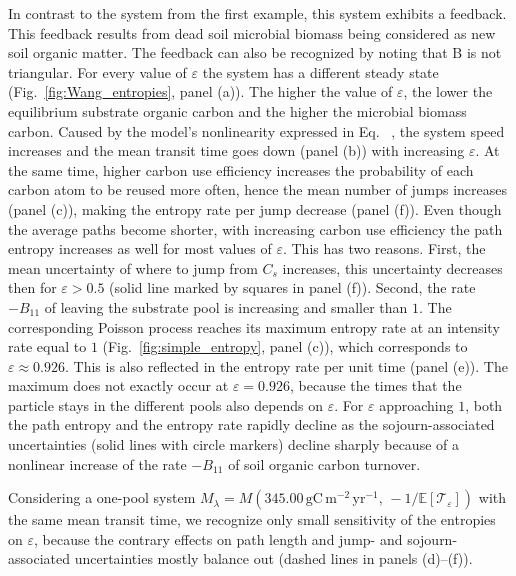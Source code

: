 \documentclass[smallextended]{svjour3}
\makeatletter
\renewcommand*{\eqref}[1]{%
  \hyperref[{#1}]{\textup{\tagform@{\ref*{#1}}}}%
}
\renewcommand{\tens}[1]{\mathrm{#1}}
\newcommand{\E}{\mathbb{E}}
\newcommand{\TT}{\mathcal{T}}
\newcommand{\gC}{\mathrm{gC}}
\newcommand{\yr}{\mathrm{yr}}
\newcommand{\meter}{\mathrm{m}}
\makeatother
\begin{document}
In contrast to the system from the first example, this system exhibits a feedback.
This feedback results from dead soil microbial biomass being considered as new soil organic matter.
The feedback can also be recognized by noting that $\tens{B}$ is not triangular.
For every value of $\varepsilon$ the system has a different steady state (Fig.~\ref{fig:Wang_entropies}, panel (a)).
The higher the value of $\varepsilon$, the lower the equilibrium substrate organic carbon and the higher the microbial biomass carbon.
Caused by the model's nonlinearity expressed in Eq.~\eqref{eqn:lambdax}, the system speed increases and the mean transit time goes down (panel (b)) with increasing $\varepsilon$.
At the same time, higher carbon use efficiency increases the probability of each carbon atom to be reused more often, hence the mean number of jumps increases (panel (c)), making the entropy rate per jump decrease (panel (f)).
Even though the average paths become shorter, with increasing carbon use efficiency the path entropy increases as well for most values of $\varepsilon$.
This has two reasons.
First, the mean uncertainty of where to jump from $C_s$ increases, this uncertainty decreases then for $\varepsilon>0.5$ (solid line marked by squares in panel (f)).
Second, the rate $-B_{11}$ of leaving the substrate pool is increasing and smaller than $1$.
The corresponding Poisson process reaches its maximum entropy rate at an intensity rate equal to $1$ (Fig.~\ref{fig:simple_entropy}, panel (c)), which corresponds to $\varepsilon\approx0.926$.
This is also reflected in the entropy rate per unit time (panel (e)).
The maximum does not exactly occur at $\varepsilon=0.926$, because the times that the particle stays in the different pools also depends on $\varepsilon$.
For $\varepsilon$ approaching $1$, both the path entropy and the entropy rate rapidly decline as the sojourn-associated uncertainties (solid lines with circle markers) decline sharply because of a nonlinear increase of the rate $-B_{11}$ of soil organic carbon turnover.

Considering a one-pool system $M_\lambda=M(345.00\,\gC\,\meter^{-2}\,\yr^{-1},\, -1/\E\left[\TT_\varepsilon\right])$ with the same mean transit time, we recognize only small sensitivity of the entropies on $\varepsilon$, because the contrary effects on path length and jump- and sojourn-associated uncertainties mostly balance out (dashed lines in panels (d)--(f)).
\end{document}
